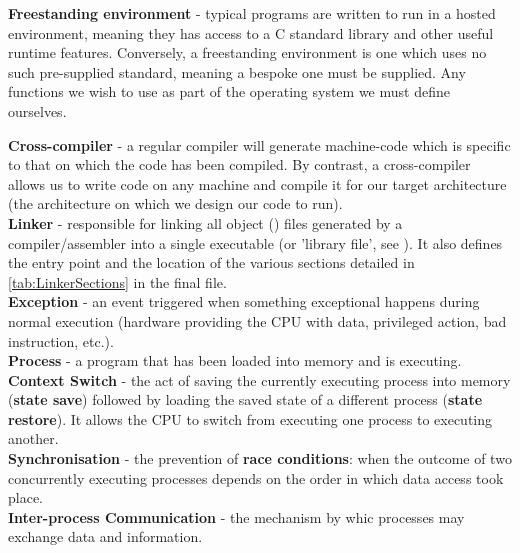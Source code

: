     \noindent \textbf{Freestanding environment} - typical programs are written
    to run in a hosted environment, meaning they has access to a C standard
    library and other useful runtime features. Conversely, a freestanding
    environment is one which uses no such pre-supplied standard, meaning a
    bespoke one must be supplied. Any functions we wish to use as part of the
    operating system we must define ourselves.

    \noindent \textbf{Cross-compiler} - a regular compiler will generate
    machine-code which is specific to that on which the code has been compiled.
    By contrast, a  cross-compiler allows us to write code on any machine and
    compile it for our target architecture (the architecture on which we design
    our code to run). \\

    \noindent \textbf{Linker} - responsible for linking all object () files
    generated by a compiler/assembler into a single executable (or 'library
    file', see \cite{StaticLibrary}). It also defines the entry point and
    the location of the various sections detailed in \ref{tab:LinkerSections} in
    the final  file.\\

    \noindent \textbf{Exception} - an event triggered when something exceptional happens
    during normal execution (hardware providing the CPU with data, privileged
    action, bad instruction, etc.). \\

    \noindent \textbf{Process} - a program that has been loaded into memory and is
    executing. \\

    \noindent \textbf{Context Switch} - the act of saving the currently executing process
    into memory (\textbf{state save}) followed by loading the saved state of a
    different process (\textbf{state restore}). It allows the CPU to switch from
    executing one process to executing another. \\

    \noindent \textbf{Synchronisation} - the prevention of \textbf{race
    conditions}: when the outcome of two concurrently executing processes
    depends on the order in which data access took place. \\

    \noindent \textbf{Inter-process Communication} - the mechanism by whic
    processes may exchange data and information. \\
        
